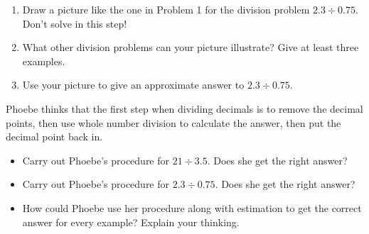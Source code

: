 \documentclass[nooutcomes,noauthor,handout]{ximera}
\begin{document}
\begin{problem}
\begin{enumerate}
\item Draw a picture like the one in Problem 1 for the division problem  $2.3 \div 0.75$.  Don't solve in this step!
\item What other division problems can your picture illustrate?  Give at least three examples.
\item Use your picture to give an approximate answer to  $2.3 \div 0.75$.
\end{enumerate}
\end{problem}



\begin{problem}
Phoebe thinks that the first step when dividing decimals is to remove the decimal points, then use whole number division to calculate the answer, then put the decimal point back in.

\begin{itemize}
	\item Carry out Phoebe's procedure for $21 \div 3.5$. Does she get the right answer?
	\item Carry out Phoebe's procedure for $2.3 \div 0.75$. Does she get the right answer?
	\item How could Phoebe use her procedure along with estimation to get the correct answer for every example? Explain your thinking.
\end{itemize}
\end{problem}
\end{document}
